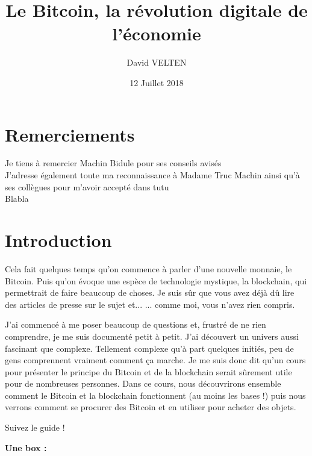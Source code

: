 \documentclass{bredele} %
\title{Le Bitcoin, la révolution digitale de l'économie}
\author{David VELTEN}
\date{12 Juillet 2018}
\begin{document}
    \maketitle

    \clearemptydoublepage
    \chapter{Remerciements}
    \thispagestyle{empty}
    Je tiens à remercier Machin Bidule pour ses conseils avisés \\
    J'adresse également toute ma reconnaissance à Madame Truc Machin ainsi qu'à ses collègues pour m'avoir accepté dans tutu \\
    Blabla

    \clearemptydoublepage
    \frontmatter

    \clearemptydoublepage
    \chapter{Introduction}

    Cela fait quelques temps qu'on commence à parler d'une nouvelle monnaie, le Bitcoin. Puis qu'on évoque une espèce de technologie mystique, la blockchain, qui permettrait de faire beaucoup de choses. Je suis sûr que vous avez déjà dû lire des articles de presse sur le sujet et...
    ... comme moi, vous n'avez rien compris.


    J'ai commencé à me poser beaucoup de questions et, frustré de ne rien comprendre, je me suis documenté petit à petit. J'ai découvert un univers aussi fascinant que complexe. Tellement complexe qu'à part quelques initiés, peu de gens comprennent vraiment comment ça marche. Je me suis donc dit qu'un cours pour présenter le principe du Bitcoin et de la blockchain serait sûrement utile pour de nombreuses personnes. Dans ce cours, nous découvrirons ensemble comment le Bitcoin et la blockchain fonctionnent (au moins les bases !) puis nous verrons comment se procurer des Bitcoin et en utiliser pour acheter des objets.

    Suivez le guide !

    \textbf{Une box : }
\end{document}

